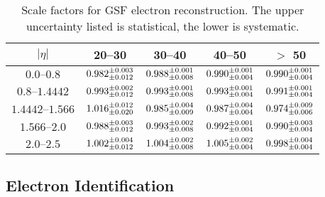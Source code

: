 \begin{table}[h]
\centering
\begin{center}
    \begin{tabular}{ | c | c | c | c | c |} \hline
	$|\eta|$                   & 20--30 \GeV                        & 30--40 \GeV                        & 40--50 \GeV                        & $>$ 50 \GeV                        \\ \hline
	$\numrange{0.0}{0.8}$      & $0.982^{\pm 0.003}_{\pm 0.012}$ & $0.988^{\pm 0.001}_{\pm 0.008}$ & $0.990^{\pm 0.001}_{\pm 0.004}$ & $0.990^{\pm 0.001}_{\pm 0.004}$ \\ \hline
	$\numrange{0.8}{1.4442}$   & $0.993^{\pm 0.002}_{\pm 0.012}$ & $0.993^{\pm 0.001}_{\pm 0.008}$ & $0.993^{\pm 0.001}_{\pm 0.004}$ & $0.991^{\pm 0.001}_{\pm 0.004}$ \\ \hline
	$\numrange{1.4442}{1.566}$ & $1.016^{\pm 0.012}_{\pm 0.020}$ & $0.985^{\pm 0.004}_{\pm 0.009}$ & $0.987^{\pm 0.004}_{\pm 0.004}$ & $0.974^{\pm 0.009}_{\pm 0.006}$ \\ \hline
	$\numrange{1.566}{2.0}$    & $0.988^{\pm 0.003}_{\pm 0.012}$ & $0.993^{\pm 0.002}_{\pm 0.008}$ & $0.992^{\pm 0.001}_{\pm 0.004}$ & $0.990^{\pm 0.003}_{\pm 0.004}$ \\ \hline
	$\numrange{2.0}{2.5}$      & $1.002^{\pm 0.004}_{\pm 0.012}$ & $1.004^{\pm 0.002}_{\pm 0.008}$ & $1.005^{\pm 0.002}_{\pm 0.004}$ & $0.998^{\pm 0.004}_{\pm 0.004}$ \\ \hline
    \end{tabular}
\end{center}
\caption{
    Scale factors for GSF electron reconstruction. The upper uncertainty listed
    is statistical, the lower is systematic.
}
\label{table:gsf_scale_factor}
\end{table}

\subsection{Electron Identification}

